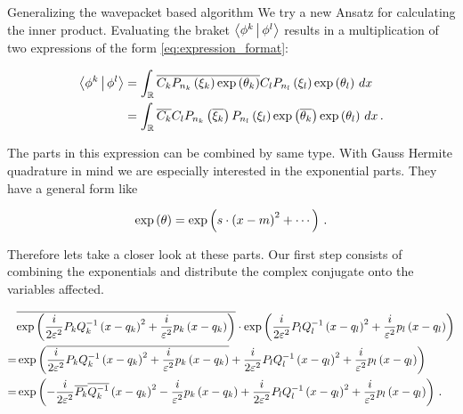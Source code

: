 \begin{chapter}{Generalizing the wavepacket based algorithm}
We try a new Ansatz for calculating the inner product. Evaluating the braket $\Braket{\phi^k | \phi^l}$
results in a multiplication of two expressions of the form \eqref{eq:expression_format}:

\begin{equation} \label{eq:expression_reformat}
\begin{split}
  \Braket{\phi^k | \phi^l} & =
  \int_\mathbb{R} \overline{C_k P_{n_k}\left( \xi_k \right) \exp \left( \theta_k \right)} C_l P_{n_l}\left( \xi_l \right) \exp \left( \theta_l \right) \,dx \\
  & =   \int_\mathbb{R} \overline{C_k} C_l P_{n_k}\left( \overline{\xi_k} \right) P_{n_l}\left( \xi_l \right) \exp \left( \overline{\theta_k} \right) \exp \left( \theta_l \right) \,dx \,.
\end{split}
\end{equation}

The parts in this expression can be combined by same type. With Gauss Hermite quadrature in
mind we are especially interested in the exponential parts. They have a general form like

\begin{equation} \label{eq:expression_format_exponential}
  \exp\left( \theta \right) = \exp\left(s \cdot \left(x-m\right)^2 + \cdots \right) \,.
\end{equation}

Therefore lets take a closer look at these parts. Our first step consists of combining the exponentials
and distribute the complex conjugate onto the variables affected.

\begin{align} \label{eq:expression_exponentials_combined}
  & \overline{\exp\left(\frac{i}{2\varepsilon^2} P_k Q_k^{-1} \left(x-q_k\right)^2 + \frac{i}{\varepsilon^2} p_k \left( x-q_k \right)\right)}
  \cdot \exp\left(\frac{i}{2\varepsilon^2} P_l Q_l^{-1} \left(x-q_l\right)^2 + \frac{i}{\varepsilon^2} p_l \left( x-q_l \right)\right) \nonumber \\
  = & \exp\left(\overline{\frac{i}{2\varepsilon^2} P_k Q_k^{-1} \left(x-q_k\right)^2 + \frac{i}{\varepsilon^2} p_k \left( x-q_k \right)}
              + \frac{i}{2\varepsilon^2} P_l Q_l^{-1} \left(x-q_l\right)^2 + \frac{i}{\varepsilon^2} p_l \left( x-q_l \right) \right) \nonumber \\
  = & \exp\left( -\frac{i}{2\varepsilon^2} \overline{P_k} \overline{Q_k^{-1}} \left(x-q_k\right)^2 - \frac{i}{\varepsilon^2} p_k \left( x-q_k \right)
              + \frac{i}{2\varepsilon^2} P_l Q_l^{-1} \left(x-q_l\right)^2 + \frac{i}{\varepsilon^2} p_l \left( x-q_l \right) \right) \,.
\end{align}


\end{chapter}
